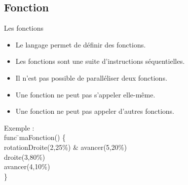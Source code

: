 \documentclass{bredelebeamer}
\begin{document}
	\subsection{Fonction} 
\begin{frame}{Les fonctions} 
\begin{itemize}
\item Le langage permet de définir des fonctions.
\item Les fonctions sont une suite d'instructions séquentielles.
\item Il n'est pas possible de paralléliser deux fonctions.
\item Une fonction ne peut pas s'appeler elle-même.
\item Une fonction ne peut pas appeler d'autres fonctions.
\end{itemize}


\begin{tabbing}
Exemple : \=\\
	\>\color{Framarouge}func \=\color{black}maFonction\color{Framarouge}() \{\\ 
	\>\>\color{Framarouge}rotationDroite(\color{black}2\color{Framarouge},\color{Framagris}25\%\color{Framarouge}) \& 
	\color{Framarouge}avancer(\color{black}5\color{Framarouge},\color{Framagris}20\%\color{Framarouge})\\ 
	\>\>\color{Framarouge}droite(\color{black}3\color{Framarouge},\color{Framagris}80\%\color{Framarouge})\\ 
	\>\>\color{Framarouge}avancer(\color{black}4\color{Framarouge},\color{Framagris}10\%\color{Framarouge})\\ 
	\>\color{Framarouge}\}
\end{tabbing}
	
	
	
	
\end{frame}
\end{document}
